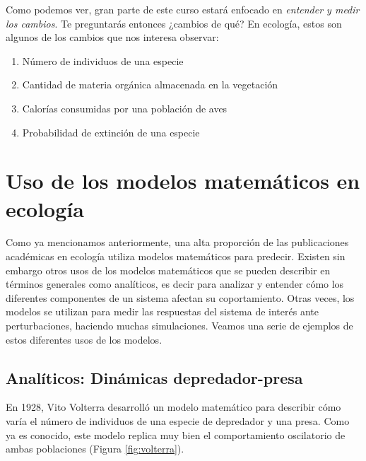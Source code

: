 \documentclass[
]{book}
\providecommand{\tightlist}{%
  \setlength{\itemsep}{0pt}\setlength{\parskip}{0pt}}
\begin{document}
Como podemos ver, gran parte de este curso estará enfocado en \emph{entender y medir los cambios}. Te preguntarás entonces ¿cambios de qué? En ecología, estos son algunos de los cambios que nos interesa observar:

\begin{enumerate}
\def\labelenumi{\arabic{enumi}.}
\tightlist
\item
  Número de individuos de una especie
\item
  Cantidad de materia orgánica almacenada en la vegetación
\item
  Calorías consumidas por una población de aves
\item
  Probabilidad de extinción de una especie
\end{enumerate}

\hypertarget{uso-de-los-modelos-matemuxe1ticos-en-ecologuxeda}{%
\section{Uso de los modelos matemáticos en ecología}\label{uso-de-los-modelos-matemuxe1ticos-en-ecologuxeda}}

Como ya mencionamos anteriormente, una alta proporción de las publicaciones académicas en ecología utiliza modelos matemáticos para predecir. Existen sin embargo otros usos de los modelos matemáticos que se pueden describir en términos generales como analíticos, es decir para analizar y entender cómo los diferentes componentes de un sistema afectan su coportamiento. Otras veces, los modelos se utilizan para medir las respuestas del sistema de interés ante perturbaciones, haciendo muchas simulaciones. Veamos una serie de ejemplos de estos diferentes usos de los modelos.

\hypertarget{analuxedticos-dinuxe1micas-depredador-presa}{%
\subsection{Analíticos: Dinámicas depredador-presa}\label{analuxedticos-dinuxe1micas-depredador-presa}}

En 1928, Vito Volterra \citep{volterra1928variations} desarrolló un modelo matemático para describir cómo varía el número de individuos de una especie de depredador y una presa. Como ya es conocido, este modelo replica muy bien el comportamiento oscilatorio de ambas poblaciones (Figura \ref{fig:volterra}).
\end{document}
